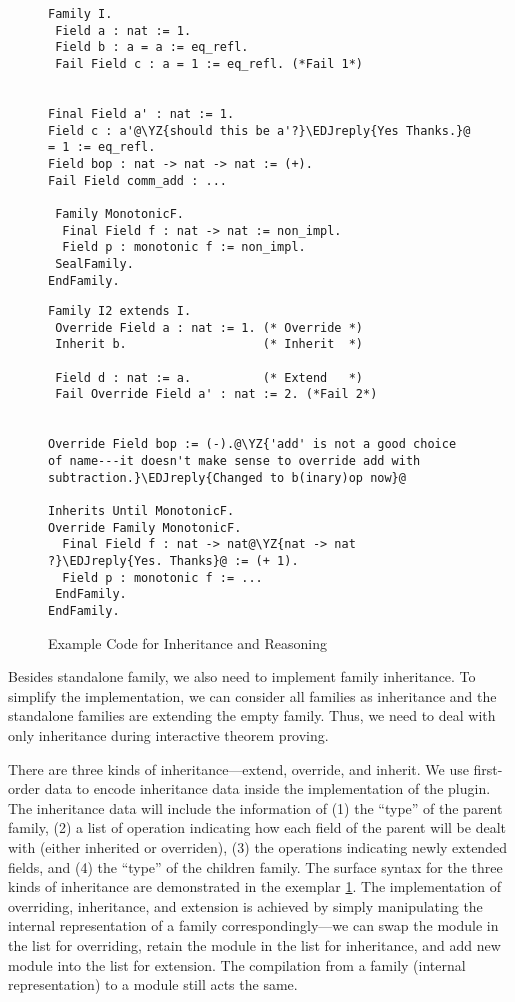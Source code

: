 \begin{figure}[!htb]
  \begin{minipage}[t]{0.45\linewidth}
\begin{verbatim}
Family I.
 Field a : nat := 1.
 Field b : a = a := eq_refl.
 Fail Field c : a = 1 := eq_refl. (*Fail 1*)


Final Field a' : nat := 1.
Field c : a'@\YZ{should this be a'?}\EDJreply{Yes Thanks.}@ = 1 := eq_refl.
Field bop : nat -> nat -> nat := (+).
Fail Field comm_add : ...

 Family MonotonicF.
  Final Field f : nat -> nat := non_impl.
  Field p : monotonic f := non_impl.
 SealFamily. 
EndFamily.
\end{verbatim}
  \end{minipage}
\begin{minipage}[t]{0.45\linewidth}
\begin{verbatim}
Family I2 extends I.
 Override Field a : nat := 1. (* Override *)
 Inherit b.                   (* Inherit  *)

 Field d : nat := a.          (* Extend   *)
 Fail Override Field a' : nat := 2. (*Fail 2*)


Override Field bop := (-).@\YZ{'add' is not a good choice of name---it doesn't make sense to override add with subtraction.}\EDJreply{Changed to b(inary)op now}@

Inherits Until MonotonicF.
Override Family MonotonicF.
  Final Field f : nat -> nat@\YZ{nat -> nat ?}\EDJreply{Yes. Thanks}@ := (+ 1).
  Field p : monotonic f := ...
 EndFamily. 
EndFamily.
\end{verbatim}
  \end{minipage}
  \caption{Example Code for Inheritance and Reasoning}\label{fig:plugin-example3}
\end{figure}

Besides standalone family, we also need to implement family inheritance.
To simplify the implementation, we can consider all families as
inheritance and the standalone families are extending the empty family.
Thus, we need to deal with only inheritance during interactive theorem proving.


There are three kinds of inheritance---extend, override, and inherit. We
use first-order data to encode inheritance data inside the
implementation of the plugin. The inheritance data will include the
information of (1) the ``type'' of the parent family, (2) a list of
operation indicating how each field of the parent will be dealt with
(either inherited or overriden), (3) the operations indicating newly
extended fields, and (4) the ``type'' of the children family.
The surface syntax for the three kinds of inheritance
are demonstrated in the exemplar \cref*{fig:plugin-example3}. The
implementation of overriding, inheritance, and extension is achieved by
simply manipulating the internal representation of a family
correspondingly---we can swap the module in the list for overriding,
retain the module in the list for inheritance, and add new module into
the list for extension. The compilation from a family (internal
representation) to a module still acts the same.


